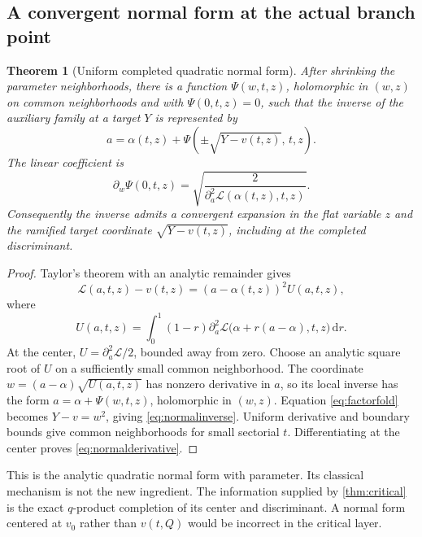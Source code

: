 \documentclass[11pt,a4paper]{article}
\numberwithin{equation}{section}
\newtheorem{theorem}{Theorem}[section]
\theoremstyle{definition}
\theoremstyle{remark}
\newcommand{\dd}{\,\mathrm d}
\begin{document}
\subsection{A convergent normal form at the actual branch point}
\begin{theorem}[Uniform completed quadratic normal form]
\label{thm:normalform}
After shrinking the parameter neighborhoods, there is a function
$\Psi(w,t,z)$, holomorphic in $(w,z)$ on common neighborhoods and with
$\Psi(0,t,z)=0$, such that the inverse of the auxiliary family at a
target $Y$ is represented by
\begin{equation}
 a=\alpha(t,z)+\Psi\!\left(\pm\sqrt{Y-v(t,z)},\,t,z\right).
 \label{eq:normalinverse}
\end{equation}
The linear coefficient is
\begin{equation}
 \partial_w\Psi(0,t,z)
 =\sqrt{\frac{2}{\partial_a^2\mathscr L(\alpha(t,z),t,z)}}.
 \label{eq:normalderivative}
\end{equation}
Consequently the inverse admits a convergent expansion in the flat
variable $z$ and the ramified target coordinate
$\sqrt{Y-v(t,z)}$, including at the completed discriminant.
\end{theorem}
\begin{proof}
Taylor's theorem with an analytic remainder gives
\begin{equation}
 \mathscr L(a,t,z)-v(t,z)
 =(a-\alpha(t,z))^2 U(a,t,z),
 \label{eq:factorfold}
\end{equation}
where
\[
 U(a,t,z)=\int_0^1(1-r)
  \partial_a^2\mathscr L\big(\alpha+r(a-\alpha),t,z\big)\dd r.
\]
At the center, $U=\partial_a^2\mathscr L/2$, bounded away from zero.
Choose an analytic square root of $U$ on a sufficiently small common
neighborhood. The coordinate
$w=(a-\alpha)\sqrt{U(a,t,z)}$ has nonzero derivative in $a$, so its
local inverse has the form $a=\alpha+\Psi(w,t,z)$, holomorphic in
$(w,z)$. Equation \eqref{eq:factorfold} becomes $Y-v=w^2$, giving
\eqref{eq:normalinverse}. Uniform derivative and boundary bounds give
common neighborhoods for small sectorial $t$. Differentiating at the
center proves \eqref{eq:normalderivative}.
\end{proof}

This is the analytic quadratic normal form with parameter. Its
classical mechanism is not the new ingredient. The information supplied
by \cref{thm:critical} is the exact $q$-product completion of its center
and discriminant. A normal form centered at $v_0$ rather than $v(t,Q)$
would be incorrect in the critical layer.
\end{document}
